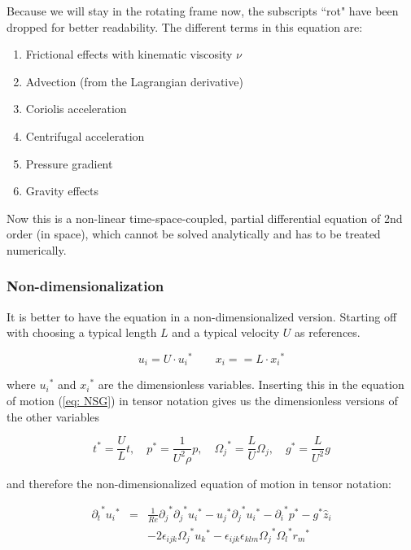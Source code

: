 \documentclass[12pt, a4paper, twoside]{article}
\begin{document}
			Because we will stay in the rotating frame now, the subscripts ``rot" have been dropped for better readability. The different terms in this equation are:
			
				\begin{enumerate}
					\item Frictional effects with kinematic viscosity $\nu$
					\item Advection (from the Lagrangian derivative)
					\item Coriolis acceleration
					\item Centrifugal acceleration
					\item Pressure gradient
					\item Gravity effects
				\end{enumerate}
			
			Now this is a non-linear time-space-coupled, partial differential equation of 2nd order (in space), which cannot be solved analytically and has to be treated numerically.
			
		\subsubsection{Non-dimensionalization}
			
			It is better to have the equation in a non-dimensionalized version. Starting off with choosing a typical length $L$ and a typical velocity $U$ as references.
			
			\begin{equation}
			u_i = U \cdot {u_i}^* \quad \quad x_i = = L \cdot {x_i}^*
			\nonumber
			\end{equation}
			
			where ${u_i}^*$ and ${x_i}^*$ are the dimensionless variables. Inserting this in  the equation of motion (\ref{eq: NSG}) in tensor notation gives us the dimensionless versions of the other variables
			
			\begin{equation}
			t^* = \frac{U}{L} t , \quad p^* = \frac{1}{U^2\rho} p , \quad {\Omega_j}^* = \frac{L}{U} \Omega_j , \quad g^* = \frac{L}{U^2} g
			\nonumber
			\end{equation}
			
			and therefore the non-dimensionalized equation of motion in tensor notation:
			
			\begin{eqnarray}
			{\partial_t}^*{u_i}^* &=& \frac{1}{Re}{\partial_j}^*{\partial_j}^*{u_i}^* - {u_j}^*{\partial_j}^*{u_i}^* -{\partial_i}^*p^* - g^*\hat{z}_i 
			\nonumber \\
			&&- 2\epsilon_{ijk}{\Omega_j}^*{u_k}^* - \epsilon_{ijk}\epsilon_{klm}{\Omega_j}^*{\Omega_l}^*{r_m}^*
			\label{eq:NonDim NSG}
			\end{eqnarray}
			
\end{document}
